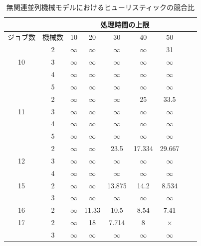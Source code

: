 \documentclass[12pt]{optlab-bachelor}
\begin{document}
\begin{table}[htb]
  \begin{center}
    \begin{tabular}{|c|c|c|c|c|c|c|c|c|} \hline
      &  & \multicolumn{5}{c|}{処理時間の上限} \\ \hline
      ジョブ数 & 機械数& 10 & 20 & 30 & 40 & 50 \\ \hline \hline

      & 2 & $\infty$ & $\infty$ & $\infty$ & $\infty$ & 31   \\ \cline{2-7}
      10 & 3 & $\infty$ & $\infty$ & $\infty$ & $\infty$ & $\infty$ \\ \cline{2-7}
      & 4 & $\infty$ & $\infty$ & $\infty$ & $\infty$ & $\infty$ \\ \cline{2-7}
      & 5 & $\infty$ & $\infty$ & $\infty$ & $\infty$ & $\infty$ \\ \hline \hline

      & 2 & $\infty$ & $\infty$ & $\infty$ & 25 & 33.5 \\ \cline{2-7}
      11 & 3 & $\infty$ & $\infty$ & $\infty$ & $\infty$  & $\infty$ \\ \cline{2-7}
      & 4 & $\infty$ & $\infty$ & $\infty$ & $\infty$ & $\infty$ \\ \cline{2-7}
      & 5 & $\infty$ & $\infty$ & $\infty$ & $\infty$ & $\infty$ \\ \hline \hline

      & 2 & $\infty$ & $\infty$ & 23.5 & 17.334 & 29.667   \\ \cline{2-7}
      12 & 3 & $\infty$ & $\infty$ & $\infty$ & $\infty$ & $\infty$ \\ \cline{2-7}
      & 4 & $\infty$ & $\infty$ & $\infty$ & $\infty$ & $\infty$ \\ \hline \hline

      15 & 2 & $\infty$ & $\infty$ & 13.875 & 14.2 & 8.534 \\ \cline{2-7}
      & 3 & $\infty$ & $\infty$ & $\infty$ & $\infty$ & $\infty$ \\ \hline \hline
      16 & 2 & $\infty$ & 11.33 & 10.5 & 8.54 & 7.41 \\ \hline \hline
      17 & 2 & $\infty$ & 18 & 7.714 & 8 & $\times$ \\ \cline{2-7}
      & 3 & $\infty$ & $\infty$ & $\infty$ & $\infty$ & $\infty$ \\ \hline \hline
    \end{tabular}
    \caption{無関連並列機械モデルにおけるヒューリスティックの競合比}
    \label{A6}
  \end{center}
\end{table}
\end{document}
